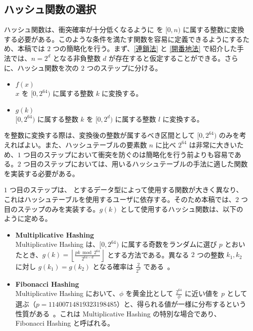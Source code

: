 \documentclass[dvipdfmx,a4j,10pt]{jarticle}
\begin{document}
\subsection{ハッシュ関数の選択}
\label{ハッシュ関数の選択}

ハッシュ関数は、衝突確率が十分低くなるように  を $[0, n)$ に属する整数に変換する必要がある。このような条件を満たす関数を容易に定義できるようにするため、本稿では $2$ つの簡略化を行う。まず、\ref{連鎖法} と \ref{開番地法} で紹介した手法では、$n = 2^d$ となる非負整数 $d$ が存在すると仮定することができる。さらに、ハッシュ関数を次の $2$ つのステップに分ける。

\begin{itemize}
  \item $f(x)$ \mbox{}\\  $x$ を $[0, 2^{64})$ に属する整数 $k$ に変換する。
  \item $g(k)$ \mbox{}\\ $[0, 2^{64})$ に属する整数 $k$ を $[0, 2^d)$ に属する整数 $l$ に変換する。
\end{itemize}

 を整数に変換する際は、変換後の整数が属するべき区間として $[0, 2^{64})$ のみを考えればよい。また、ハッシュテーブルの要素数 $n$ に比べ $2^{64}$ は非常に大きいため、$1$ つ目のステップにおいて衝突を防ぐのは簡略化を行う前よりも容易である。$2$ つ目のステップにおいては、用いるハッシュテーブルの手法に適した関数を実装する必要がある。

$1$ つ目のステップは、 とするデータ型によって使用する関数が大きく異なり、これはハッシュテーブルを使用するユーザに依存する。そのため本稿では、$2$ つ目のステップのみを実装する。$g(k)$ として使用するハッシュ関数は、以下のように定める。

\begin{itemize}
  \item \textbf{Multiplicative Hashing} \mbox{}\\ Multiplicative Hashing は、$[0, 2^{64})$ に属する奇数をランダムに選び $p$ とおいたとき、$\displaystyle g(k) = \left\lfloor \frac{pk \bmod 2^{64}}{2^{64-d}} \right\rfloor$ とする方法である。異なる $2$ つの整数 $k_1, k_2$ に対し $g(k_1) = g(k_2)$ となる確率は $\displaystyle \frac{2}{2^d}$ である~\cite{データ構造}。
  \item \textbf{Fibonacci Hashing} \mbox{}\\ Multiplicative Hashing において、$\phi$ を黄金比として $\displaystyle \frac{2^{64}}{\phi}$ に近い値を $p$ として選ぶ（$p = 11400714819323198485$）と、得られる値が一様に分布するという性質がある~\cite{FibHash}。これは Multiplicative Hashing の特別な場合であり、Fibonacci Hashing と呼ばれる。
\end{itemize}
\end{document}
